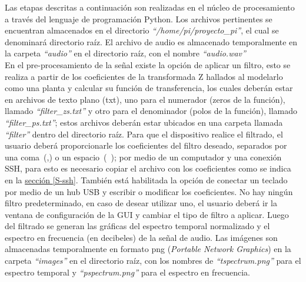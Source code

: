 \documentclass[11pt,lettersize]{article} %
\newcommand{\seccion}[1]{\hyperref[{#1}]{sección \ref*{#1}}}
\begin{document}
Las etapas descritas a continuación son realizadas en el núcleo de procesamiento a través del lenguaje de programación Python. Los archivos pertinentes se encuentran almacenados en el directorio \textit{``/home/pi/proyecto\_pi''}, el cual se denominará directorio raíz. El archivo de audio es almacenado temporalmente en la carpeta \textit{``audio''} en el directorio raíz, con el nombre \textit{``audio.wav''} \\

En el pre-procesamiento de la señal existe la opción de aplicar un filtro, esto se realiza a partir de los coeficientes de la transformada Z hallados al modelarlo como una planta y calcular su función de transferencia, los cuales deberán estar en archivos de texto plano (txt), uno para el numerador (zeros de la función), llamado \textit{``filter\_zs.txt''} y otro para el denominador (polos de la función), llamado \textit{``filter\_ps.txt''}; estos archivos deberán estar ubicados en una carpeta llamada \textit{``filter''} dentro del directorio raíz. Para que el dispositivo realice el filtrado, el usuario deberá proporcionarle los coeficientes del filtro deseado, separados por una \mbox{coma (,)} o un \mbox{espacio ( )}; por medio de un computador y una conexión SSH, para esto es necesario copiar el archivo con los coeficientes como se indica en la \seccion{S-ssh}. También está habilitada la opción de conectar un teclado por medio de un hub USB y escribir o modificar los coeficientes. No hay ningún filtro predeterminado, en caso de desear utilizar uno, el usuario deberá ir la ventana de configuración de la GUI y cambiar el tipo de filtro a aplicar. Luego del filtrado se generan las gráficas del espectro temporal normalizado y el espectro en frecuencia (en decibeles) de la señal de audio. Las imágenes son almacenadas temporalmente en formato png (\textit{Portable Network Graphics}) en la carpeta \textit{``images''} en el directorio raíz, con los nombres de \textit{``tspectrum.png''} para el espectro temporal y \textit{``pspectrum.png''} para el espectro en frecuencia. \\
\end{document}
